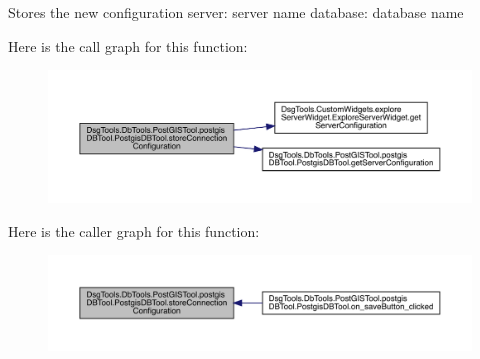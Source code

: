 \begin{DoxyVerb}Stores the new configuration
server: server name
database: database name
\end{DoxyVerb}
 Here is the call graph for this function\+:
\nopagebreak
\begin{figure}[H]
\begin{center}
\leavevmode
\includegraphics[width=350pt]{class_dsg_tools_1_1_db_tools_1_1_post_g_i_s_tool_1_1postgis_d_b_tool_1_1_postgis_d_b_tool_aefe5dcf655069dd0aa32d5d9ea668239_cgraph}
\end{center}
\end{figure}
Here is the caller graph for this function\+:
\nopagebreak
\begin{figure}[H]
\begin{center}
\leavevmode
\includegraphics[width=350pt]{class_dsg_tools_1_1_db_tools_1_1_post_g_i_s_tool_1_1postgis_d_b_tool_1_1_postgis_d_b_tool_aefe5dcf655069dd0aa32d5d9ea668239_icgraph}
\end{center}
\end{figure}
\mbox{\label{class_dsg_tools_1_1_db_tools_1_1_post_g_i_s_tool_1_1postgis_d_b_tool_1_1_postgis_d_b_tool_a8e83dd803b5cf94e8bf42974a3d91635}} 
